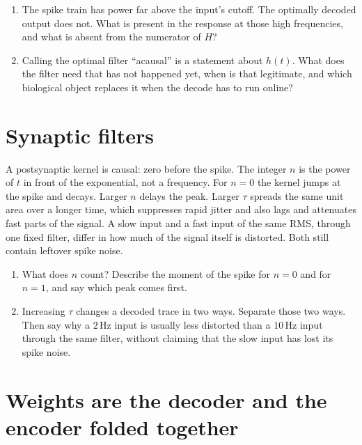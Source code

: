 \documentclass[11pt,letterpaper]{article}
\begin{document}
\begin{enumerate}
\item The spike train has power far above the input's cutoff. The optimally decoded output does not. What is present in the response at those high frequencies, and what is absent from the numerator of \(H\)?
\item Calling the optimal filter ``acausal'' is a statement about \(h(t)\). What does the filter need that has not happened yet, when is that legitimate, and which biological object replaces it when the decode has to run online?
\end{enumerate}

\section{Synaptic filters}

\begin{idea}
A postsynaptic kernel is causal: zero before the spike. The integer \(n\) is the power of \(t\) in front of the exponential, not a frequency. For \(n = 0\) the kernel jumps at the spike and decays. Larger \(n\) delays the peak. Larger \(\tau\) spreads the same unit area over a longer time, which suppresses rapid jitter and also lags and attenuates fast parts of the signal. A slow input and a fast input of the same RMS, through one fixed filter, differ in how much of the signal itself is distorted. Both still contain leftover spike noise.
\end{idea}

\begin{enumerate}
\item What does \(n\) count? Describe the moment of the spike for \(n = 0\) and for \(n = 1\), and say which peak comes first.
\item Increasing \(\tau\) changes a decoded trace in two ways. Separate those two ways. Then say why a \(2\,\mathrm{Hz}\) input is usually less distorted than a \(10\,\mathrm{Hz}\) input through the same filter, without claiming that the slow input has lost its spike noise.
\end{enumerate}

\section{Weights are the decoder and the encoder folded together}
\end{document}
